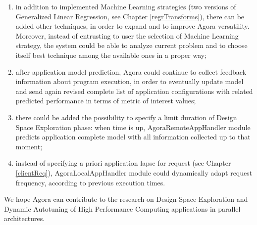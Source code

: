 \begin{enumerate}

	\item in addition to implemented Machine Learning strategies (two versions of Generalized Linear Regression, see Chapter \ref{regrTransforms}), there can be added other techniques, in order to expand and to improve Agora versatility. Moreover, instead of entrusting to user the selection of Machine Learning strategy, the system could be able to analyze current problem and to choose itself best technique among the available ones in a proper way;

	\item after application model prediction, Agora could continue to collect feedback information about program execution, in order to eventually update model and send again revised complete list of application configurations with related predicted performance in terms of metric of interest values;

	\item there could be added the possibility to specify a limit duration of Design Space Exploration phase: when time is up, AgoraRemoteAppHandler module predicts application complete model with all information collected up to that moment;

	\item instead of specifying a priori application lapse for request (see Chapter \ref{clientReq}), AgoraLocalAppHandler module could dynamically a\-dapt request frequency, according to previous execution times.

\end{enumerate}

We hope Agora can contribute to the research on Design Space Exploration and Dynamic Autotuning of High Performance Computing applications in parallel architectures.
